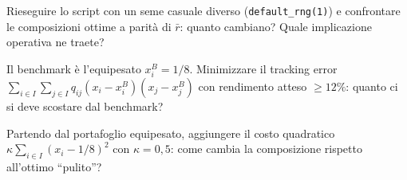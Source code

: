 \begin{esercizio}
Rieseguire lo script con un seme casuale diverso (\texttt{default\_rng(1)}) e
confrontare le composizioni ottime a parità di $\bar r$: quanto cambiano? Quale
implicazione operativa ne traete?
\end{esercizio}

\begin{esercizio}
Il benchmark è l'equipesato $x^B_i = 1/8$. Minimizzare il tracking error
$\sum_{i \in I}\sum_{j \in I} q_{ij} (x_i - x^B_i)(x_j - x^B_j)$ con rendimento atteso $\ge 12\%$: quanto ci si deve scostare dal
benchmark?
\end{esercizio}

\begin{esercizio}
Partendo dal portafoglio equipesato, aggiungere il costo quadratico
$\kappa \sum_{i \in I} (x_i - 1/8)^2$ con $\kappa = 0{,}5$: come cambia la composizione
rispetto all'ottimo ``pulito''?
\end{esercizio}
